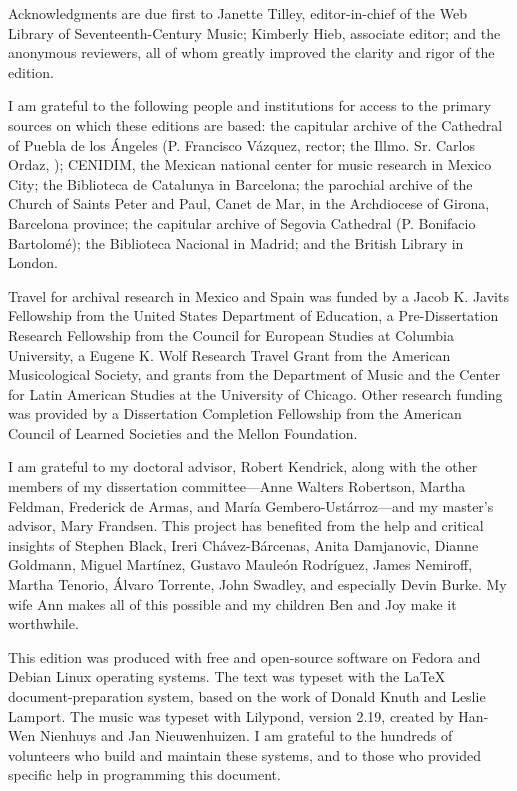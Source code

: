 Acknowledgments are due first to Janette Tilley, editor-in-chief of the Web
Library of Seventeenth-Century Music; Kimberly Hieb, associate editor; and the
anonymous reviewers, all of whom greatly improved the clarity and rigor of the
edition.

I am grateful to the following people and institutions for access to the 
primary sources on which these editions are based: 
the capitular archive of the Cathedral of Puebla de los Ángeles (P. Francisco 
Vázquez, rector; the Illmo. Sr. Carlos Ordaz, );
CENIDIM, the Mexican national center for music research in Mexico City;
the Biblioteca de Catalunya in Barcelona;
the parochial archive of the Church of Saints Peter and Paul, Canet de Mar, in 
the Archdiocese of Girona, Barcelona province;
the capitular archive of Segovia Cathedral (P. Bonifacio Bartolomé);
the Biblioteca Nacional in Madrid; and
the British Library in London.

Travel for archival research in Mexico and Spain was funded by 
a Jacob K. Javits Fellowship from the United States Department of Education, 
a Pre-Dissertation Research Fellowship from the Council for European Studies at 
Columbia University, 
a Eugene K. Wolf Research Travel Grant from the American Musicological Society, 
and grants from the Department of Music and the Center for Latin American 
Studies at the University of Chicago.
Other research funding was provided by a Dissertation Completion Fellowship 
from the American Council of Learned Societies and the Mellon Foundation.

I am grateful to my doctoral advisor, Robert Kendrick, along with the other
members of my dissertation committee---Anne Walters Robertson, Martha Feldman,
Frederick de Armas, and María Gembero-Ustárroz---and my master's advisor, Mary
Frandsen.
This project has benefited from the help and critical insights of 
Stephen Black,
Ireri Chávez-Bárcenas,
Anita Damjanovic, 
Dianne Goldmann,
Miguel Martínez, 
Gustavo Mauleón Rodríguez,
James Nemiroff, 
Martha Tenorio,
Álvaro Torrente, 
John Swadley,
and especially Devin Burke.
My wife Ann makes all of this possible and my children Ben and Joy make it
worthwhile.


This edition was produced with free and open-source software on Fedora and
Debian Linux operating systems.
The text was typeset with the \LaTeX{} document-preparation system, based on 
the work of Donald Knuth and Leslie Lamport.
The music was typeset with Lilypond, version 2.19, created by Han-Wen Nienhuys
and Jan Nieuwenhuizen.
I am grateful to the hundreds of volunteers who build and maintain these 
systems, and to those who provided specific help in programming this document.

